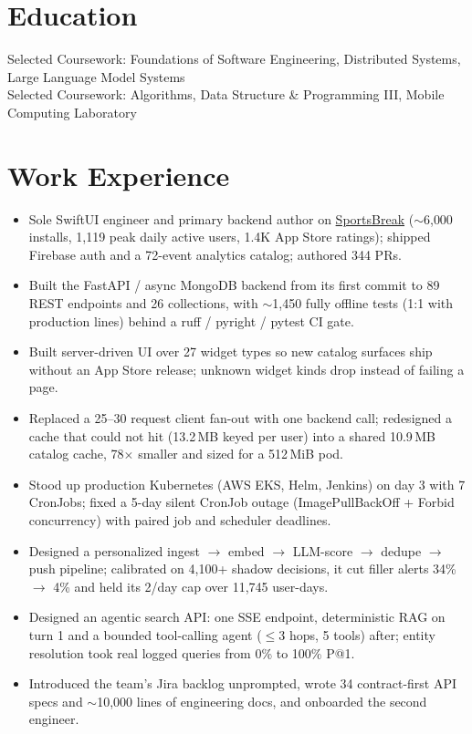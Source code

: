 \documentclass[11pt, letterpaper]{article}
\begin{document}

\section{Education}
Selected Coursework: Foundations of Software Engineering, Distributed Systems, Large Language Model Systems\\[1pt]
Selected Coursework: Algorithms, Data Structure \& Programming III, Mobile Computing Laboratory

\section{Work Experience}
\begin{itemize}
  \item Sole SwiftUI engineer and primary backend author on \href{https://apps.apple.com/app/id6762649287}{SportsBreak} ($\sim$6{,}000 installs, 1{,}119 peak daily active users, 1.4K App Store ratings); shipped Firebase auth and a 72-event analytics catalog; authored 344 PRs.
  \item Built the FastAPI / async MongoDB backend from its first commit to 89 REST endpoints and 26 collections, with $\sim$1{,}450 fully offline tests (1:1 with production lines) behind a ruff / pyright / pytest CI gate.
  \item Built server-driven UI over 27 widget types so new catalog surfaces ship without an App Store release; unknown widget kinds drop instead of failing a page.
  \item Replaced a 25--30 request client fan-out with one backend call; redesigned a cache that could not hit (13.2\,MB keyed per user) into a shared 10.9\,MB catalog cache, 78$\times$ smaller and sized for a 512\,MiB pod.
  \item Stood up production Kubernetes (AWS EKS, Helm, Jenkins) on day 3 with 7 CronJobs; fixed a 5-day silent CronJob outage (ImagePullBackOff + Forbid concurrency) with paired job and scheduler deadlines.
  \item Designed a personalized ingest $\to$ embed $\to$ LLM-score $\to$ dedupe $\to$ push pipeline; calibrated on 4{,}100+ shadow decisions, it cut filler alerts 34\% $\to$ 4\% and held its 2/day cap over 11{,}745 user-days.
  \item Designed an agentic search API: one SSE endpoint, deterministic RAG on turn 1 and a bounded tool-calling agent ($\le$3 hops, 5 tools) after; entity resolution took real logged queries from 0\% to 100\% P@1.
  \item Introduced the team's Jira backlog unprompted, wrote 34 contract-first API specs and $\sim$10{,}000 lines of engineering docs, and onboarded the second engineer.
\end{itemize}
\end{document}
